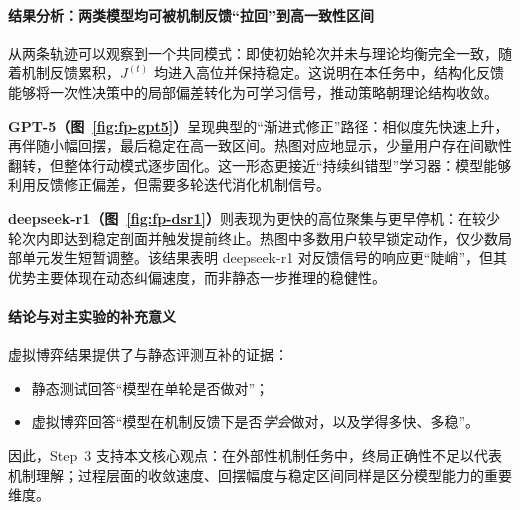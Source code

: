 \paragraph{结果分析：两类模型均可被机制反馈“拉回”到高一致性区间}
从两条轨迹可以观察到一个共同模式：即使初始轮次并未与理论均衡完全一致，随着机制反馈累积，$J^{(t)}$ 均进入高位并保持稳定。这说明在本任务中，结构化反馈能够将一次性决策中的局部偏差转化为可学习信号，推动策略朝理论结构收敛。

\textbf{GPT-5（图~\ref{fig:fp-gpt5}）}呈现典型的“渐进式修正”路径：相似度先快速上升，再伴随小幅回摆，最后稳定在高一致区间。热图对应地显示，少量用户存在间歇性翻转，但整体行动模式逐步固化。这一形态更接近“持续纠错型”学习器：模型能够利用反馈修正偏差，但需要多轮迭代消化机制信号。

\textbf{deepseek-r1（图~\ref{fig:fp-dsr1}）}则表现为更快的高位聚集与更早停机：在较少轮次内即达到稳定剖面并触发提前终止。热图中多数用户较早锁定动作，仅少数局部单元发生短暂调整。该结果表明 deepseek-r1 对反馈信号的响应更“陡峭”，但其优势主要体现在动态纠偏速度，而非静态一步推理的稳健性。

\paragraph{结论与对主实验的补充意义}
虚拟博弈结果提供了与静态评测互补的证据：
\begin{itemize}
  \item 静态测试回答“模型在单轮是否做对”；
  \item 虚拟博弈回答“模型在机制反馈下是否\emph{学会}做对，以及学得多快、多稳”。
\end{itemize}
因此，Step~3 支持本文核心观点：在外部性机制任务中，终局正确性不足以代表机制理解；过程层面的收敛速度、回摆幅度与稳定区间同样是区分模型能力的重要维度。
